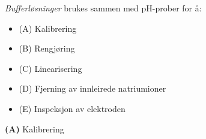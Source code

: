 

{\it Bufferløsninger} brukes sammen med pH-prober for å:

\begin{itemize}
\item{(A)} Kalibrering
\vskip 5pt 
\item{(B)} Rengjøring
\vskip 5pt 
\item{(C)} Linearisering
\vskip 5pt 
\item{(D)} Fjerning av innleirede natriumioner
\vskip 5pt 
\item{(E)} Inspeksjon av elektroden
\end{itemize}







{\bf (A)} Kalibrering
 







